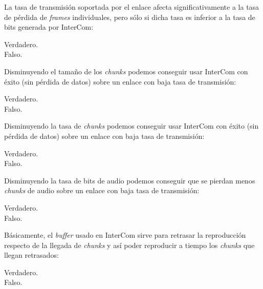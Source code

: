 \documentclass[legalpaper, 12pt, addpoints]{exam}
\begin{document}
\begin{questions}
\vspace{0.10in}

\question La tasa de transmisión soportada por el enlace afecta
significativamente a la tasa de pérdida de \emph{frames} individuales,
pero sólo si dicha tasa es inferior a la tasa de bits generada por
InterCom:

\begin{oneparchoices}
  \choice Verdadero.\\
  \choice Falso.
\end{oneparchoices}
  
\vspace{0.10in}

\question Disminuyendo el tamaño de los \emph{chunks} podemos
conseguir usar InterCom con éxito (sin pérdida de datos) sobre un
enlace con baja tasa de transmisión:

\begin{oneparchoices}
  \choice Verdadero.\\
  \choice Falso.
\end{oneparchoices}
  
\vspace{0.10in}

\question Disminuyendo la tasa de \emph{chunks} podemos conseguir usar
InterCom con éxito (sin pérdida de datos) sobre un enlace con baja
tasa de transmisión:

\begin{oneparchoices}
  \choice Verdadero.\\
  \choice Falso.
\end{oneparchoices}
  
\vspace{0.10in}

\question Disminuyendo la tasa de bits de audio podemos conseguir que
se pierdan menos \emph{chunks} de audio sobre un enlace con baja tasa
de transmisión:

\begin{oneparchoices}
  \choice Verdadero.\\
  \choice Falso.
\end{oneparchoices}
  
\vspace{0.10in}

\question Básicamente, el \emph{buffer} usado en InterCom sirve para
retrasar la reproducción respecto de la llegada de \emph{chunks} y así
poder reproducir a tiempo los \emph{chunks} que llegan retrasados:

\begin{oneparchoices}
  \choice Verdadero.\\
  \choice Falso.
\end{oneparchoices}
  

\end{questions}
\end{document}
